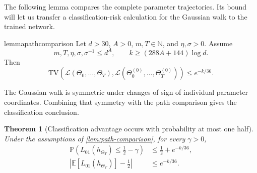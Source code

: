 \documentclass[11pt,twoside]{article}
\newcommand{\E}{\mathbb E}
\renewcommand{\P}{\mathbb P}
\newcommand{\Law}{\mathcal L}
\newcommand{\TV}{\mathrm{TV}}
\newtheorem{theorem}{Theorem}[section]
\theoremstyle{definition}
\theoremstyle{remark}
\begin{document}
The following lemma compares the complete parameter trajectories. Its bound
will let us transfer a classification-risk calculation for the Gaussian walk
to the trained network.

\begin{restatable}{lemma}{pathcomparison}
\label{lem:path-comparison}
Let $d>30$, $A>0$, $m,T\in\mathbb N$, and $\eta,\sigma>0$. Assume
\begin{equation}
m,T,\eta,\sigma,\sigma^{-1}\le d^A,
\qquad
k\ge(288A+144)\log d.
\label{eq:hardness-conditions}
\end{equation}
Then
\begin{equation}
\TV\!\left(
\Law(\Theta_0,\ldots,\Theta_T),
\Law(\Theta^{(0)}_0,\ldots,\Theta^{(0)}_T)
\right)
\le e^{-k/36}.
\label{eq:path-tv}
\end{equation}
\end{restatable}

The Gaussian walk is symmetric under changes of sign of individual parameter
coordinates. Combining that symmetry with the path comparison gives the
classification conclusion.

\begin{theorem}[Classification advantage occurs with probability at most one half]
\label{thm:classification}
Under the assumptions of \cref{lem:path-comparison}, for every $\gamma>0$,
\begin{align}
\P\!\left(L_{01}(h_{\Theta_T})\le\frac12-\gamma\right)
&\le\frac12+e^{-k/36},
\label{eq:classification-probability}\\
\left|\E[L_{01}(h_{\Theta_T})]-\frac12\right|
&\le e^{-k/36}.
\label{eq:classification-expectation}
\end{align}
\end{theorem}
\end{document}
